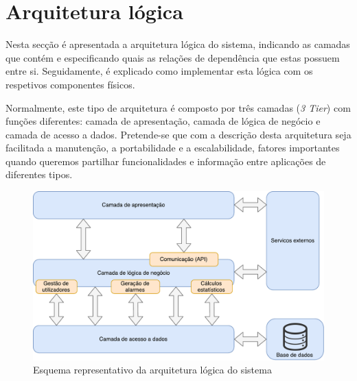 


\newpage
\section{Arquitetura lógica}

Nesta secção é apresentada a arquitetura lógica do sistema, indicando as camadas que contém e especificando quais as relações de dependência que estas possuem entre si. Seguidamente, é explicado como implementar esta lógica com os respetivos componentes físicos. 


Normalmente, este tipo de arquitetura é composto por três camadas (\textit{3 Tier})\cite{Josuttis2001} com funções diferentes: camada de apresentação, camada de lógica de negócio e camada de acesso a dados. Pretende-se que com a descrição desta arquitetura seja facilitada a manutenção, a portabilidade e a
escalabilidade, fatores importantes quando queremos partilhar funcionalidades e informação entre aplicações de diferentes tipos.




\begin{figure}[!htb]
	\centering
	\includegraphics[scale = 0.6]{esquemas/arquitetura-logica.pdf}
	\caption{Esquema representativo da arquitetura lógica do sistema }
	\label{logicaarqu}
\end{figure}



